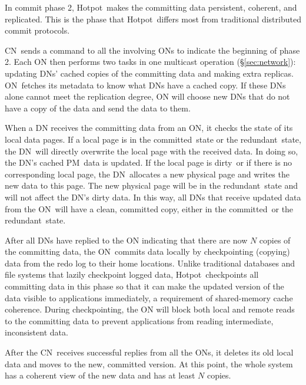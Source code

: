 \documentclass[sigconf]{acmart}
\newcommand{\nvm}{PM}
\newcommand{\hotpot}{Hotpot}
\newcommand{\on}{ON}
\newcommand{\dn}{DN}
\newcommand{\xn}{CN}
\newcommand{\dirty}{dirty}
\newcommand{\committed}{committed}
\newcommand{\redundant}{redundant}
\begin{document}
{
In commit phase 2, \hotpot\ makes the committing data persistent, 
coherent, and replicated.
This is the phase that \hotpot\ differs most from traditional distributed commit protocols.

\xn\ sends a command to all the involving \on{}s to indicate the beginning of phase 2.  
Each \on{} then performs two tasks in one multicast operation (\S\ref{sec:network}): 
updating \dn{}s' cached copies of the committing data and making extra replicas.
\on\ fetches its metadata to know what \dn{}s have a cached copy.
If these \dn{}s alone cannot meet the replication degree, \on{} will choose new \dn{}s that do not have
a copy of the data and send the data to them.

When a \dn{} receives the committing data from an \on,
it checks the state of its local data pages.
If a local page is in the \committed\ state or the \redundant\ state, 
the \dn\ will directly overwrite the local page with the received data.
In doing so, the \dn's cached \nvm\ data is updated.
If the local page is \dirty\  or if there is no corresponding local page,
the \dn\ allocates a new physical page and writes the new data to this page.
The new physical page will be in the \redundant\ state and will not affect the \dn's dirty data.
In this way, all \dn{}s that receive updated data from the \on\ will 
have a clean, committed copy, either in the \committed\ or the \redundant\ state.

After all \dn{}s have replied to the \on{} indicating that there are now $N$ copies of the committing data,
the \on\ commits data locally
by checkpointing (copying) data from the redo log to their home locations.
Unlike traditional databases and file systems that lazily checkpoint logged data, 
\hotpot\ checkpoints all committing data in this phase 
so that it can make the updated version of the data
visible to applications immediately, 
a requirement of shared-memory cache coherence.
During checkpointing, the \on{} will block both local and remote reads to the committing data
to prevent applications from reading intermediate, inconsistent data.

After the \xn\ receives successful replies from all the \on{}s, 
it deletes its old local data and moves to the new, committed version. 
At this point, the whole system has a coherent view of the new data
and has at least $N$ copies.

}
\end{document}
